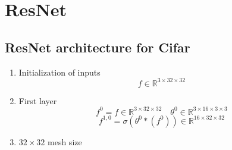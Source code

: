 \newpage
\section{ResNet}
\subsection{ResNet architecture for Cifar}
\begin{enumerate}
\item Initialization of inputs
$$
f \in \mathbb{R}^{3\times 32\times 32}
$$
\item First layer
$$f^0=f\in \mathbb{R}^{3\times 32\times 32} \quad \theta^0 \in \mathbb{R}^{3\times 16\times 3\times 3}$$
$$f^{1,0}= \sigma(\theta^{0} \ast (f^0))\in \mathbb{R}^{16 \times 32\times 32}$$
\item $32\times 32$ mesh size\\


\end{enumerate}
